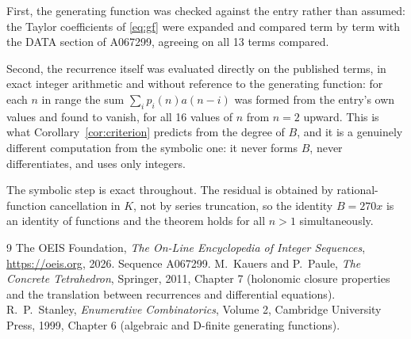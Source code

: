 \documentclass[11pt,a4paper]{article}
\theoremstyle{plain}
\theoremstyle{definition}
\begin{document}
First, the generating function was checked against the entry rather than assumed: the
Taylor coefficients of \eqref{eq:gf} were expanded and compared term by term with the DATA
section of A067299, agreeing on all 13 terms compared.

Second, the recurrence itself was evaluated directly on the published terms, in exact
integer arithmetic and without reference to the generating function: for each $n$ in range
the sum $\sum_{i}p_{i}(n)a(n-i)$ was formed from the entry's own values and found to
vanish, for all 16 values of $n$ from $n=2$ upward. This is what
Corollary~\ref{cor:criterion} predicts from the degree of $B$, and it is a genuinely
different computation from the symbolic one: it never forms $B$, never differentiates, and
uses only integers.

The symbolic step is exact throughout. The residual is obtained by rational-function
cancellation in $K$, not by series truncation, so the identity $B=270 x$ is an
identity of functions and the theorem holds for all $n>1$ simultaneously.

\begin{thebibliography}{9}
 The OEIS Foundation, \emph{The On-Line Encyclopedia of Integer Sequences},
\url{https://oeis.org}, 2026. Sequence A067299.
 M.~Kauers and P.~Paule, \emph{The Concrete Tetrahedron}, Springer, 2011,
Chapter 7 (holonomic closure properties and the translation between recurrences and
differential equations).
 R.~P.~Stanley, \emph{Enumerative Combinatorics}, Volume 2, Cambridge
University Press, 1999, Chapter 6 (algebraic and D-finite generating functions).
\end{thebibliography}
\end{document}
